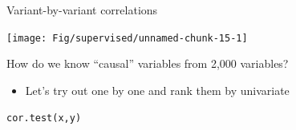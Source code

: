 \documentclass[
  ignorenonframetext,
  aspectratio=169]{beamer}
\providecommand{\tightlist}{%
  \setlength{\itemsep}{0pt}\setlength{\parskip}{0pt}}
\begin{document}
\begin{frame}{Variant-by-variant correlations}
\protect\hypertarget{variant-by-variant-correlations}{}
\scriptsize

\begin{center}\texttt{[image: Fig/supervised/unnamed-chunk-15-1]} \end{center}

\normalsize
\end{frame}

\begin{frame}[fragile]{How do we know ``causal'' variables from 2,000
variables?}
\protect\hypertarget{how-do-we-know-causal-variables-from-2000-variables}{}
\begin{itemize}
\tightlist
\item
  Let's try out one by one and rank them by univariate
\end{itemize}

\Large

\texttt{cor.test(x,y)}

\normalsize

\scriptsize

\normalsize

\scriptsize

\normalsize

\scriptsize


\normalsize

\scriptsize


\normalsize

\scriptsize


\normalsize

\scriptsize


\normalsize

\scriptsize


\normalsize
\end{frame}
\end{document}

